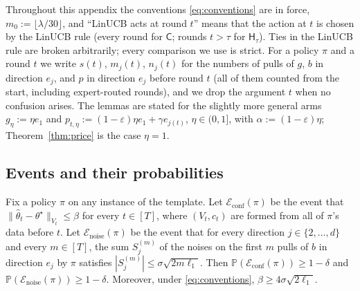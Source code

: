 \documentclass[anon]{alt2027} %
\newcommand{\Prb}{\mathbb{P}}
\newcommand{\eps}{\varepsilon}
\newcommand{\Cold}{\mathsf{C}}
\newcommand{\Hyb}{\mathsf{H}}
\begin{document}
Throughout this appendix the conventions \eqref{eq:conventions} are in force,
$m_0:=\lfloor\lambda/30\rfloor$, and ``LinUCB acts at round
$t$'' means that the action at $t$ is chosen by the LinUCB rule (every round
for $\Cold$; rounds $t>\tau$ for $\Hyb_\tau$). Ties in the LinUCB rule are
broken arbitrarily; every comparison we use is strict. For a policy $\pi$ and
a round $t$ we write $s(t)$, $m_j(t)$, $n_j(t)$ for the numbers of pulls of
$g$, $b$ in direction $e_j$, and $p$ in direction $e_j$ before round $t$
(all of them counted from the start, including expert-routed rounds), and we
drop the argument $t$ when no confusion arises. The lemmas are stated for
the slightly more general arms $g_\eta:=\eta e_1$ and
$p_{t,\eta}:=(1-\eps)\eta e_1+\gamma e_{j(t)}$, $\eta\in(0,1]$, with
$\alpha:=(1-\eps)\eta$; Theorem~\ref{thm:price} is the case $\eta=1$.

\subsection{Events and their probabilities}

\begin{lemma}
\label{lem:cat-events}
Fix a policy $\pi$ on any instance of the template. Let
$\mathcal E_{\mathrm{conf}}(\pi)$ be the event that
$\|\widehat\theta_t-\theta^\star\|_{V_t}\le\beta$ for every $t\in[T]$, where
$(V_t,c_t)$ are formed from all of $\pi$'s data before $t$. Let
$\mathcal E_{\mathrm{noise}}(\pi)$ be the event that for every direction
$j\in\{2,\dots,d\}$ and every $m\in[T]$, the sum $S_j^{(m)}$ of the noises on
the first $m$ pulls of $b$ in direction $e_j$ by $\pi$ satisfies
$|S_j^{(m)}|\le\sigma\sqrt{2m\ell_1}$. Then
$\Prb(\mathcal E_{\mathrm{conf}}(\pi))\ge1-\delta$ and
$\Prb(\mathcal E_{\mathrm{noise}}(\pi))\ge1-\delta$. Moreover, under
\eqref{eq:conventions}, $\beta\ge4\sigma\sqrt{2\ell_1}$.
\end{lemma}
\end{document}
